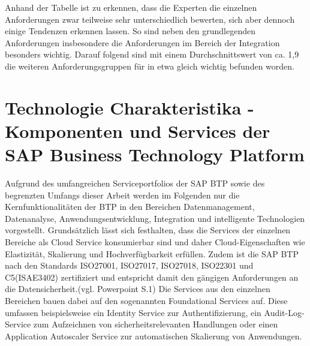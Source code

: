 
Anhand der Tabelle ist zu erkennen, dass die Experten die einzelnen Anforderungen zwar teilweise sehr unterschiedlich bewerten, sich aber dennoch einige Tendenzen erkennen lassen. So sind neben den grundlegenden Anforderungen insbesondere die Anforderungen im Bereich der Integration besonders wichtig. Darauf folgend sind mit einem Durchschnittswert von ca. 1,9 die weiteren Anforderungsgruppen für in etwa gleich wichtig befunden worden. 









\section{Technologie Charakteristika - Komponenten und Services der SAP Business Technology Platform}\label{sec:TechCharak}


Aufgrund des umfangreichen Serviceportfolios der SAP BTP sowie des begrenzten Umfangs dieser Arbeit werden im Folgenden nur die Kernfunktionalitäten der BTP in den Bereichen Datenmanagement, Datenanalyse, Anwendungsentwicklung, Integration und intelligente Technologien vorgestellt. Grundsätzlich lässt sich festhalten, dass die Services der einzelnen Bereiche als Cloud Service konsumierbar sind und daher Cloud-Eigenschaften wie Elastizität, Skalierung und Hochverfügbarkeit erfüllen. \autocite[Vgl.][S. 60]{SEUBERT} Zudem ist die SAP BTP nach den Standards ISO27001, ISO27017, ISO27018, ISO22301 und C5(ISAE3402) zertifiziert und entspricht damit den gängigen Anforderungen an die Datensicherheit.(vgl. Powerpoint S.1) Die Services aus den einzelnen Bereichen bauen dabei auf den sogenannten Foundational Services auf. Diese umfassen beispielsweise ein Identity Service zur Authentifizierung, ein Audit-Log-Service zum Aufzeichnen von sicherheitsrelevanten Handlungen oder einen Application Autoscaler Service zur automatischen Skalierung von Anwendungen. \autocite[Vgl.][S. 58]{SEUBERT}


